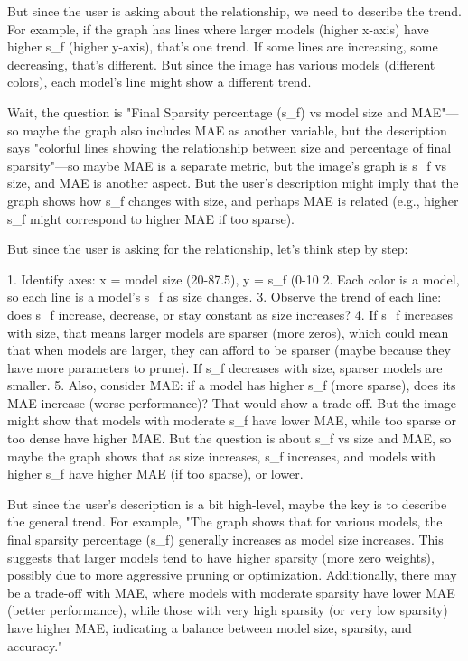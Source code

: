 But since the user is asking about the relationship, we need to describe the trend. For example, if the graph has lines where larger models (higher x-axis) have higher s_f (higher y-axis), that's one trend. If some lines are increasing, some decreasing, that's different. But since the image has various models (different colors), each model's line might show a different trend. 

Wait, the question is "Final Sparsity percentage (s_f) vs model size and MAE"—so maybe the graph also includes MAE as another variable, but the description says "colorful lines showing the relationship between size and percentage of final sparsity"—so maybe MAE is a separate metric, but the image's graph is s_f vs size, and MAE is another aspect. But the user's description might imply that the graph shows how s_f changes with size, and perhaps MAE is related (e.g., higher s_f might correspond to higher MAE if too sparse). 

But since the user is asking for the relationship, let's think step by step:

1. Identify axes: x = model size (20-87.5), y = s_f (0-10%
2. Each color is a model, so each line is a model's s_f as size changes.
3. Observe the trend of each line: does s_f increase, decrease, or stay constant as size increases?
4. If s_f increases with size, that means larger models are sparser (more zeros), which could mean that when models are larger, they can afford to be sparser (maybe because they have more parameters to prune). If s_f decreases with size, sparser models are smaller.
5. Also, consider MAE: if a model has higher s_f (more sparse), does its MAE increase (worse performance)? That would show a trade-off. But the image might show that models with moderate s_f have lower MAE, while too sparse or too dense have higher MAE. But the question is about s_f vs size and MAE, so maybe the graph shows that as size increases, s_f increases, and models with higher s_f have higher MAE (if too sparse), or lower. 

But since the user's description is a bit high-level, maybe the key is to describe the general trend. For example, "The graph shows that for various models, the final sparsity percentage (s_f) generally increases as model size increases. This suggests that larger models tend to have higher sparsity (more zero weights), possibly due to more aggressive pruning or optimization. Additionally, there may be a trade-off with MAE, where models with moderate sparsity have lower MAE (better performance), while those with very high sparsity (or very low sparsity) have higher MAE, indicating a balance between model size, sparsity, and accuracy." 

